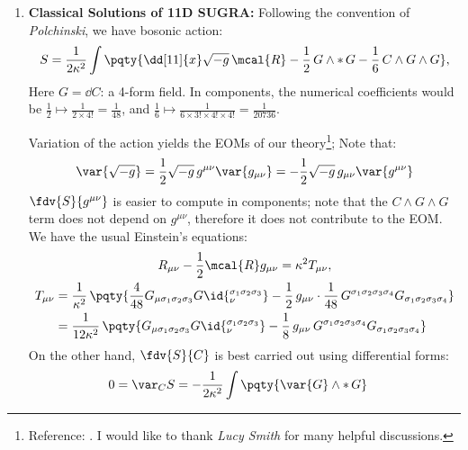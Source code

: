 \documentclass[a4paper,10pt]{article}
\begin{document}
\begin{enumerate}
	\item \textbf{Classical Solutions of 11D SUGRA:}
	Following the convention of \textit{Polchinski}, we have bosonic action:
	\begin{equation}
		S = \frac{1}{2\kappa^2}
			\int \pqty{
				\dd[11]{x} \sqrt{-g}\,
					\mcal{R}
				- \frac{1}{2}\,
					G\wedge *\,G
				- \frac{1}{6}\,
					C\wedge G\wedge G
			},
	\end{equation}
	Here $G = \dd{C}$: a 4-form field. In components, the numerical coefficients would be $
		\frac{1}{2}
		\mapsto
		\frac{1}{2\times 4!} = \frac{1}{48}
	$, and $
		\frac{1}{6}
		\mapsto
		\frac{1}{6\times 3!\times 4!\times 4!}
		= \frac{1}{20736}
	$. 
	
	Variation of the action yields the EOMs of our theory\footnote{
		Reference: . I would like to thank \textit{Lucy Smith} for many helpful discussions. 
	}; Note that:
	\begin{equation}
		\var{\sqrt{-g}}
		= \frac{1}{2}\sqrt{-g}\,
			g^{\mu\nu} \var{g_{\mu\nu}}
		= -\frac{1}{2}\sqrt{-g}\,
			g_{\mu\nu} \var{g^{\mu\nu}}
	\end{equation}
	$\fdv{S}{g^{\mu\nu}}$ is easier to compute in components; note that the $
		C\wedge G\wedge G
	$ term does not depend on $g^{\mu\nu}$, therefore it does not contribute to the EOM. 
	We have the usual Einstein's equations:
	\begin{gather}
		R_{\mu\nu}
			- \frac{1}{2} \mcal{R} g_{\mu\nu}
		= \kappa^2 T_{\mu\nu},\\
	\begin{aligned}
		T_{\mu\nu}
		&= \frac{1}{\kappa^2}\,\pqty{
			\frac{4}{48}
			G_{\mu\sigma_1\sigma_2\sigma_3}
			G\id{_\nu^{\sigma_1\sigma_2\sigma_3}}
			- \frac{1}{2}\,g_{\mu\nu}
				\cdot \frac{1}{48}\,
				G^{\sigma_1\sigma_2\sigma_3\sigma_4}
				G_{\sigma_1\sigma_2\sigma_3\sigma_4}
		} \\
		&= \frac{1}{12\kappa^2}\,\pqty{
			G_{\mu\sigma_1\sigma_2\sigma_3}
			G\id{_\nu^{\sigma_1\sigma_2\sigma_3}}
			- \frac{1}{8}\,g_{\mu\nu}\,
				G^{\sigma_1\sigma_2\sigma_3\sigma_4}
				G_{\sigma_1\sigma_2\sigma_3\sigma_4}
		}
	\end{aligned}
	\label{eq:bosonic_stress_tensor}
	\end{gather}
	On the other hand, $
		\fdv{S}{C}
	$ is best carried out using differential forms:
	\begin{gather}
	\begin{aligned}
		0 = \var_C{S}
		&= -\frac{1}{2\kappa^2}
			\int \pqty{
				\var{G} \wedge *\,G
}
\end{aligned}
\end{gather}
\end{enumerate}
\end{document}
